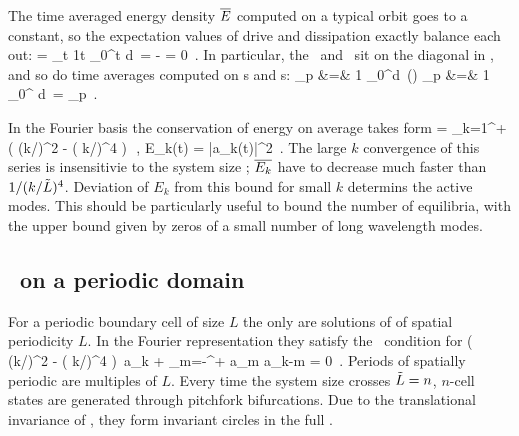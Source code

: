 The time averaged energy density  $\overline{E}$
computed on a typical orbit goes to a constant, so
the expectation values  of drive and dissipation
exactly balance each out:
\beq
	  = 
	\lim_{t\rightarrow \infty}
		{1\over t} \int_0^t d\tau \, \dot{\expctE}
=
	   - 
= 0 
	\,.
In particular, the \eqva\
and \reqva\ sit on the diagonal in ,
and so do time averages computed on \po s and \rpo s:
\bea
{}_p &=& 
{1\over {}} \int_0^d\tau \, \expctE(\tau)
	\continue
{}_p &=& 
{1\over {}} \int_0^ d\tau \,  
	=
	  _p
	\,.
\label{poE}
\eea

In the Fourier basis  the conservation of energy on average
takes form
 = \sum_{k=1}^{+\infty} ( (k/\tildeL)^2 - ( k/\tildeL)^4 )\, 
\,,\qquad 
E_k(t) =  |a_k(t)|^2
\,.
The large $k$ convergence of this series is insensitivie to the
system size \tildeL; $\overline{E_k}$ have to decrease much faster than 
$1/( k/\tilde{L})^4$.
Deviation of $E_k$ from this bound for small $k$ determins the active modes.
This should be particularly useful to bound the number of equilibria, with
the upper bound given by zeros of a small number 
of long wavelength modes.
%

\subsection{\Eqva\ on a periodic domain}

For a periodic boundary cell of size 
$L$ the only {\eqva}  are
solutions of  of spatial periodicity $L$.
In the Fourier representation they satisfy 
the \eqv\ condition for 
\beq
( (k/\tildeL)^2 - ( k/\tildeL)^4 )\, a_k 
    +   \sum_{m=-\infty}^{+\infty} a_m a_{k-m}
  = 0
\,.
\label{eq:stfks}
\eeq 
Periods of spatially periodic {\eqva} are multiples of $L$.
Every time the system size crosses  $\tilde{L}=n$,
$n$-cell states
are generated through pitchfork bifurcations. 
Due to the translational invariance of {\KSe},
they form invariant circles
in the full \statesp.

